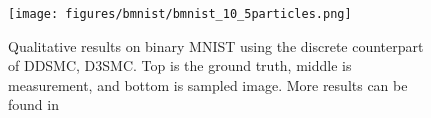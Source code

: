 
\begin{figure}[tb!]
        \centering
        \texttt{[image: figures/bmnist/bmnist\_10\_5particles.png]}
\caption{\label{fig:bmnist} Qualitative results on binary MNIST using the discrete counterpart of DDSMC, D3SMC. Top is the ground truth, middle is measurement, and bottom is sampled image. More results can be found in }
\end{figure}
